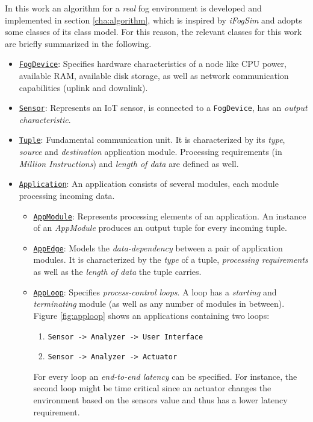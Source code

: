 In this work an algorithm for a \textit{real} fog environment is developed and implemented in section \ref{cha:algorithm}, which is inspired by \textit{iFogSim} and adopts some classes of its class model. For this reason, the relevant classes for this work are briefly summarized in the following.\\

\begin{itemize}
    \item \underline{\texttt{FogDevice}}: Specifies hardware characteristics of a node like CPU power, available RAM, available disk storage, as well as network communication capabilities (uplink and downlink).
    
    \item \underline{\texttt{Sensor}}: Represents an IoT sensor, is connected to a \texttt{FogDevice}, has an \textit{output characteristic}.
    
    \item \underline{\texttt{Tuple}}: Fundamental communication unit. It is characterized by its \textit{type}, \textit{source} and \textit{destination} application module. Processing requirements (in \textit{Million Instructions}) and \textit{length of data} are defined as well. 
    
    \item \underline{\texttt{Application}}: An application consists of several modules, each module processing incoming data.
    \begin{itemize}
        \item \underline{\texttt{AppModule}}: Represents processing elements of an application. An instance of an \textit{AppModule} produces an output tuple for every incoming tuple.
        
        \item \underline{\texttt{AppEdge}}: Models the \textit{data-dependency} between a pair of application modules. It is characterized by the \textit{type} of a tuple, \textit{processing requirements} as well as the \textit{length of data} the tuple carries.
        
        \item \underline{\texttt{AppLoop}}: Specifies \textit{process-control loops}. A loop has a \textit{starting} and \textit{terminating} module (as well as any number of modules in between). Figure \ref{fig:apploop} shows an applications containing two loops: \begin{enumerate}
            \item \texttt{Sensor -> Analyzer -> User Interface}
            \item \texttt{Sensor -> Analyzer -> Actuator}
        \end{enumerate}
        For every loop an \textit{end-to-end latency} can be specified. For instance, the second loop might be time critical since an actuator changes the environment based on the sensors value and thus has a lower latency requirement.
    \end{itemize}
\end{itemize}

